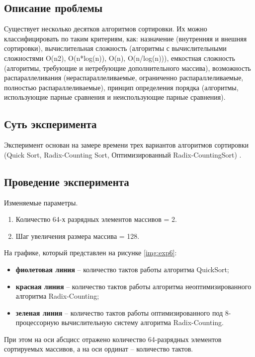 \subsection{Описание проблемы}
Существует несколько десятков алгоритмов сортировки. Их можно классифицировать по таким критериям, как: назначение (внутренняя и внешняя сортировки), вычислительная сложность (алгоритмы с вычислительными сложностями O(n2), O(n*log(n)), O(n), O(n/log(n))), емкостная сложность (алгоритмы, требующие и нетребующие   дополнительного   массива),   возможность   распараллеливания   (нераспараллеливаемые, ограниченно распараллеливаемые, полностью распараллеливаемые), принцип   определения   порядка   (алгоритмы,   использующие   парные   сравнения   и   неиспользующие парные сравнения).

\subsection{Суть эксперимента}  
Эксперимент основан на замере времени трех вариантов алгоритмов сортировки (Quick Sort, Radix-Counting Sort, Оптимизированный Radix-CountingSort) .


\subsection{Проведение эксперимента}

Изменяемые параметры.

\begin{enumerate}
	\item Количество 64-х разрядных элементов массивов = 2.
	\item Шаг увеличения размера массива = 128.
\end{enumerate}

На графике, который представлен на рисунке \ref{img:exp6}:
\begin{itemize}
	\item \textbf{фиолетовая линия} -- количество тактов работы алгоритма QuickSort;
	\item \textbf{красная линия} -- количество тактов работы алгоритма неоптимизированного алгоритма Radix-Counting;
	\item \textbf{зеленая линия} -- количество тактов работы оптимизированного под 8-процессорную вычислительную систему алгоритма Radix-Counting.
\end{itemize}

При этом на оси абсцисс отражено количество 64-разрядных элементов сортируемых массивов, а на оси ординат -- количество тактов.


